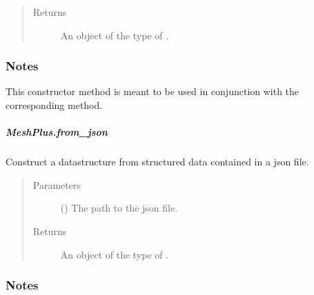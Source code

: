 \documentclass[letterpaper,10pt,english]{sphinxmanual}
\begin{document}
\begin{fulllineitems}
\begin{fulllineitems}
\begin{quote}
\begin{description}
\item[{Returns}] \leavevmode
{} \textendash{} An object of the type of .

\end{description}\end{quote}
\subsubsection*{Notes}

This constructor method is meant to be used in conjunction with the
corresponding  method.

\end{fulllineitems}



\subparagraph{MeshPlus.from\_json}
\label{\detokenize{api/generated/directional_clustering.mesh.MeshPlus.from_json:meshplus-from-json}}\label{\detokenize{api/generated/directional_clustering.mesh.MeshPlus.from_json::doc}}

\begin{fulllineitems}
\label{\detokenize{api/generated/directional_clustering.mesh.MeshPlus.from_json:directional_clustering.mesh.MeshPlus.from_json}}
Construct a datastructure from structured data contained in a json file.
\begin{quote}\begin{description}
\item[{Parameters}] \leavevmode
{} () \textendash{} The path to the json file.

\item[{Returns}] \leavevmode
{} \textendash{} An object of the type of .

\end{description}\end{quote}
\subsubsection*{Notes}


\end{fulllineitems}
\end{fulllineitems}
\end{document}

